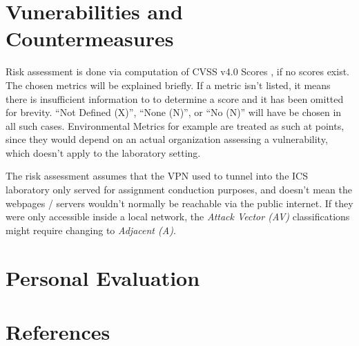 \documentclass[11pt]{article}
\begin{document}


\newpage





\newpage
 
\section{Vunerabilities and Countermeasures} \label{sec:vuln_counter}
\begin{itemize}
Risk assessment is done via computation of CVSS v4.0 Scores \autocite{first:cvss4}, if no scores exist.
The chosen metrics will be explained briefly. 
If a metric isn't listed, it means there is insufficient information to to determine a score and it has been omitted for brevity. \enquote{Not Defined (X)}, \enquote{None (N)}, or \enquote{No (N)} will have be chosen in all such cases.
Environmental Metrics for example are treated as such at points, since they would depend on an actual organization assessing a vulnerability, which doesn't apply to the laboratory setting.

The risk assessment assumes that the VPN used to tunnel into the ICS laboratory only served for assignment conduction purposes, and doesn't mean the webpages / servers wouldn't normally be reachable via the public internet. If they were only accessible inside a local network, the \textit{Attack Vector (AV)} classifications might require changing to \textit{Adjacent (A)}.
\end{itemize}



\newpage




\section{Personal Evaluation}







\newpage

\section{References}

\printbibliography[heading=none]

\newpage


\resumetoc
\end{document}
